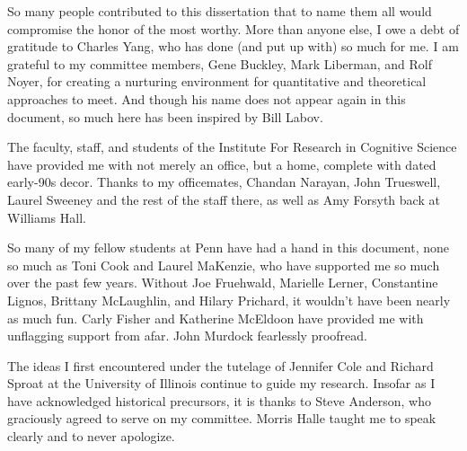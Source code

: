 So many people contributed to this dissertation that to name them all would compromise the honor of the most worthy. More than anyone else, I owe a debt of gratitude to Charles Yang, who has done (and put up with) so much for me. I am grateful to my committee members, Gene Buckley, Mark Liberman, and Rolf Noyer, for creating a nurturing environment for quantitative and theoretical approaches to meet. And though his name does not appear again in this document, so much here has been inspired by Bill Labov. 

The faculty, staff, and students of the Institute For Research in Cognitive Science have provided me with not merely an office, but a home, complete with dated early-90s decor. Thanks to my officemates, Chandan Narayan, John Trueswell, Laurel Sweeney and the rest of the staff there, as well as Amy Forsyth back at Williams Hall.

So many of my fellow students at Penn have had a hand in this document, none so much as Toni Cook and Laurel MaKenzie, who have supported me so much over the past few years. Without Joe Fruehwald, Marielle Lerner, Constantine Lignos, Brittany McLaughlin, and Hilary Prichard, it wouldn't have been nearly as much fun. Carly Fisher and Katherine McEldoon have provided me with unflagging support from afar. John Murdock fearlessly proofread.

The ideas I first encountered under the tutelage of Jennifer Cole and Richard Sproat at the University of Illinois continue to guide my research. Insofar as I have acknowledged historical precursors, it is thanks to Steve Anderson, who graciously agreed to serve on my committee. Morris Halle taught me to speak clearly and to never apologize.
